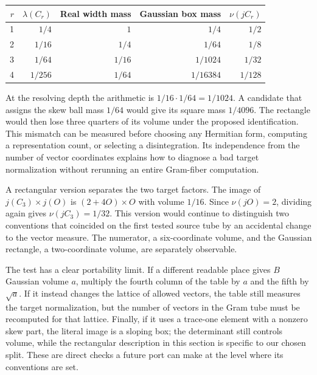 \documentclass[12pt,letterpaper]{article}
\begin{document}
\begin{center}\small\begin{tabular}{@{}rrrrr@{}}\toprule
$r$ & $\lambda(C_r)$ & Real width mass & Gaussian box mass & $\nu(jC_r)$\\\midrule
1 & $1/4$ & $1$ & $1/4$ & $1/2$\\
2 & $1/16$ & $1/4$ & $1/64$ & $1/8$\\
3 & $1/64$ & $1/16$ & $1/1024$ & $1/32$\\
4 & $1/256$ & $1/64$ & $1/16384$ & $1/128$\\\bottomrule
\end{tabular}\end{center}
At the resolving depth the arithmetic is $1/16\cdot1/64=1/1024$. A candidate that assigns the skew ball mass $1/64$ would give its square mass $1/4096$. The rectangle would then lose three quarters of its volume under the proposed identification. This mismatch can be measured before choosing any Hermitian form, computing a representation count, or selecting a disintegration. Its independence from the number of vector coordinates explains how to diagnose a bad target normalization without rerunning an entire Gram-fiber computation.

A rectangular version separates the two target factors. The image of $j(C_3)\times j(O)$ is $(2+4O)\times O$ with volume $1/16$. Since $\nu(jO)=2$, dividing again gives $\nu(jC_3)=1/32$. This version would continue to distinguish two conventions that coincided on the first tested source tube by an accidental change to the vector measure. The numerator, a six-coordinate volume, and the Gaussian rectangle, a two-coordinate volume, are separately observable.

The test has a clear portability limit. If a different readable place gives $B$ Gaussian volume $a$, multiply the fourth column of the table by $a$ and the fifth by $\sqrt a$. If it instead changes the lattice of allowed vectors, the table still measures the target normalization, but the number of vectors in the Gram tube must be recomputed for that lattice. Finally, if it uses a trace-one element with a nonzero skew part, the literal image is a sloping box; the determinant still controls volume, while the rectangular description in this section is specific to our chosen split. These are direct checks a future port can make at the level where its conventions are set.
\end{document}
